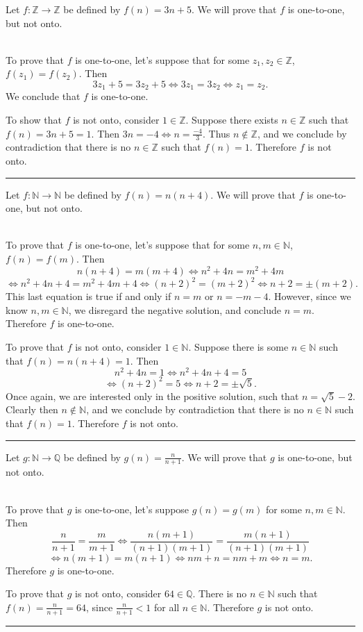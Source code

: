 \documentclass[11pt]{hmcpset}
\newenvironment{problem2}[1]{\noindent {\bf (#1}}
{\medskip}
\newenvironment{problem1}[1]{\noindent {\bf Problem #1}}
{\medskip}
\newenvironment{proof}{\noindent {\bf Proof:} \\}{\hfill
\rule{1mm}{3mm} \bigskip}
\begin{document}
\begin{problem1}{1. (a)} Let $f:\mathbb{Z}\to\mathbb{Z}$ be defined by $f(n)=3n+5$. We will prove that $f$ is one-to-one, but not onto.

\begin{proof}\indent To prove that $f$ is one-to-one, let's suppose that for some $z_1, z_2 \in \mathbb{Z}$, $f(z_1)=f(z_2)$. Then $$3z_1+5=3z_2+5 \iff 3z_1=3z_2 \iff z_1=z_2.$$ We conclude that $f$ is one-to-one.

To show that $f$ is not onto, consider $1\in\mathbb{Z}$. Suppose there exists $n\in\mathbb{Z}$ such that $f(n)=3n+5=1.$ Then $3n=-4 \iff n=\frac{-4}{3}$. Thus $n\notin\mathbb{Z}$, and we conclude by contradiction that there is no $n\in\mathbb{Z}$ such that $f(n)=1$. Therefore $f$ is not onto.
\end{proof}
\end{problem1}

\begin{problem2}{b)} Let $f:\mathbb{N}\to\mathbb{N}$ be defined by $f(n)=n(n+4)$. We will prove that $f$ is one-to-one, but not onto.

\begin{proof}\indent To prove that $f$ is one-to-one, let's suppose that for some $n,m \in \mathbb{N}$, $f(n)=f(m)$. Then $$n(n+4)=m(m+4) \iff n^2+4n=m^2+4m$$ $$\iff n^2+4n+4=m^2+4m+4 \iff (n+2)^2=(m+2)^2\iff n+2=\pm(m+2).$$ This last equation is true if and only if $n=m$ or $n=-m-4$. However, since we know $n,m\in \mathbb{N}$, we disregard the negative solution, and conclude $n=m$. Therefore $f$ is one-to-one.

To prove that $f$ is not onto, consider $1\in \mathbb{N}$. Suppose there is some $n\in\mathbb{N}$ such that $f(n)=n(n+4)=1.$ Then $$n^2+4n=1\iff n^2+4n+4=5$$ $$\iff (n+2)^2=5 \iff n+2=\pm \sqrt{5}.$$ Once again, we are interested only in the positive solution, such that $n=\sqrt{5}-2$. Clearly then $n\notin\mathbb{N}$, and we conclude by contradiction that there is no $n\in\mathbb{N}$ such that $f(n)=1$. Therefore $f$ is not onto.%
\end{proof}

\end{problem2}
\begin{problem2}{c)} Let $g:\mathbb{N}\to\mathbb{Q}$ be defined by $g(n)=\frac{n}{n+1}$. We will prove that $g$ is one-to-one, but not onto.

\begin{proof}\indent To prove that $g$ is one-to-one, let's suppose $g(n)=g(m)$ for some $n,m\in \mathbb{N}$. Then $$\frac{n}{n+1}=\frac{m}{m+1} \iff \frac{n(m+1)}{(n+1)(m+1)}= \frac{m(n+1)}{(n+1)(m+1)}$$ $$\iff n(m+1)=m(n+1)\iff nm+n=nm+m \iff n=m.$$ Therefore $g$ is one-to-one.

To prove that $g$ is not onto, consider $64\in\mathbb{Q}$. There is no $n\in\mathbb{N}$ such that $f(n)=\frac{n}{n+1}=64$, since $\frac{n}{n+1}<1$ for all $n\in\mathbb{N}$. Therefore $g$ is not onto.

\end{proof}
\end{problem2}
\end{document}

